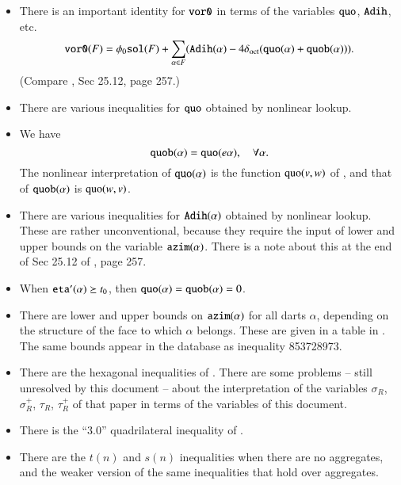 \begin{itemize}
    \item There is an important identity for ${\operatorname{{\texttt{vor0}}}}$ in terms of the
    variables ${\operatorname{{\texttt{quo}}}}$, ${\operatorname{{\texttt{Adih}}}}$, etc.
    \begin{equation}
    {\operatorname{{\texttt{vor0}}}}(F) = \phi_0 {\operatorname{{\texttt{sol}}}}(F) +\sum_{\alpha\in F}
    ({\operatorname{{\texttt{Adih}}}}(\alpha) - 4\delta_{\operatorname{oct}}({\operatorname{{\texttt{quo}}}}(\alpha)
    +{\operatorname{{\texttt{quob}}}}(\alpha))).
    \end{equation}
    (Compare \cite{DCG}, Sec 25.12, page 257.)
%
    \item There are various inequalities for ${\operatorname{{\texttt{quo}}}}$ obtained
    by nonlinear lookup.
%
    \item We have
        \begin{equation}
        {\operatorname{{\texttt{quob}}}}(\alpha) = {\operatorname{{\texttt{quo}}}}(e\alpha),\quad
        \forall\alpha.
        \end{equation}
    The nonlinear interpretation of ${\operatorname{{\texttt{quo}}}}(\alpha)$ is
    the function ${\operatorname{quo}}(v,w)$ of \cite{DCG}, and that of
    ${\operatorname{{\texttt{quob}}}}(\alpha)$ is ${\operatorname{quo}}(w,v)$.
%
    \item There are various inequalities for ${\operatorname{{\texttt{Adih}}}}(\alpha)$
    obtained by nonlinear lookup.  These are rather
    unconventional, because they require the input of lower and
    upper bounds on the variable ${\operatorname{{\texttt{azim}}}}(\alpha)$.  There is
    a note about this at the end of Sec 25.12 of \cite{DCG}, page 257.
%
    \item When ${\operatorname{{\texttt{eta}}}}'(\alpha)\succeq t_0$, then ${\operatorname{{\texttt{quo}}}}(\alpha)
    = {\operatorname{{\texttt{quob}}}}(\alpha)=0$.
    \item There are lower and upper bounds on ${\operatorname{{\texttt{azim}}}}(\alpha)$ for all
    darts $\alpha$, depending on the structure of the face to
    which $\alpha$ belongs.  These are given in a table in
    \cite[VI,p.54]{KEP98}.  The same bounds appear in the database as
    inequality 853728973.
    \item There are the hexagonal inequalities of \cite[25.13]{DCG}.
  There are some problems -- still unresolved by this document --
  about the interpretation of the variables $\sigma_R$,
  $\sigma_R^+$, $\tau_R$, $\tau_R^+$ of that paper in terms of the variables
  of this document.
  \item There is the ``$3.0$'' quadrilateral inequality of
  \cite[Sec.25.10]{DCG}.
  \item There are the $t(n)$ and $s(n)$ inequalities when there
  are no aggregates, and the weaker version of the same
  inequalities that hold over aggregates.
\end{itemize}

